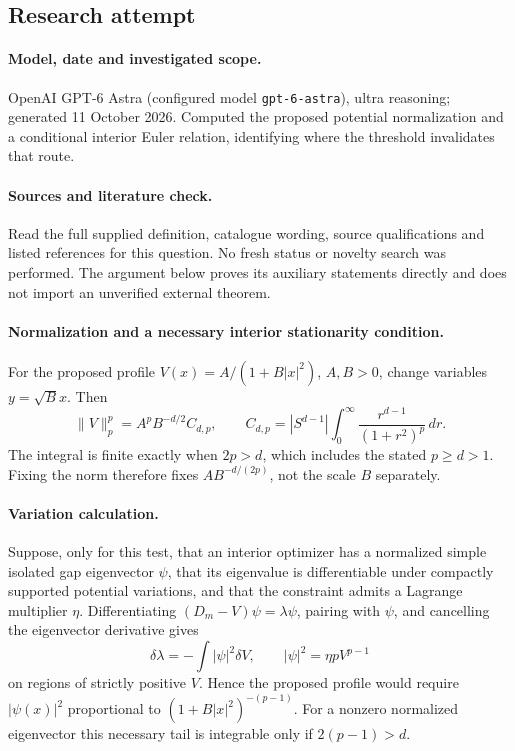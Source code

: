 \documentclass[11pt]{article}
\begin{document}
\subsection{Research attempt}
\paragraph{Model, date and investigated scope.}
OpenAI GPT-6 Astra (configured model \texttt{gpt-6-astra}), ultra reasoning; generated 11 October 2026. Computed the proposed potential normalization and a conditional interior Euler relation, identifying where the threshold invalidates that route.

\paragraph{Sources and literature check.}
Read the full supplied definition, catalogue wording, source qualifications and listed references for this question. No fresh status or novelty search was performed. The argument below proves its auxiliary statements directly and does not import an unverified external theorem.

\paragraph{Normalization and a necessary interior stationarity condition.} For the proposed profile \(V(x)=A/(1+B|x|^2)\), \(A,B>0\), change variables \(y=\sqrt Bx\). Then
\[
 \|V\|_p^p=A^p B^{-d/2}C_{d,p},\qquad
 C_{d,p}=|S^{d-1}|\int_0^\infty\frac{r^{d-1}}{(1+r^2)^p}\,dr.
\]
The integral is finite exactly when \(2p>d\), which includes the stated \(p\geq d>1\). Fixing the norm therefore fixes \(AB^{-d/(2p)}\), not the scale \(B\) separately.
\paragraph{Variation calculation.} Suppose, only for this test, that an interior optimizer has a normalized simple isolated gap eigenvector \(\psi\), that its eigenvalue is differentiable under compactly supported potential variations, and that the constraint admits a Lagrange multiplier \(\eta\). Differentiating \((D_m-V)\psi=\lambda\psi\), pairing with \(\psi\), and cancelling the eigenvector derivative gives
\[
 \delta\lambda=-\int|\psi|^2\delta V,
 \qquad |\psi|^2=\eta pV^{p-1}
\]
on regions of strictly positive \(V\). Hence the proposed profile would require \(|\psi(x)|^2\) proportional to \((1+B|x|^2)^{-(p-1)}\). For a nonzero normalized eigenvector this necessary tail is integrable only if \(2(p-1)>d\).
\end{document}
